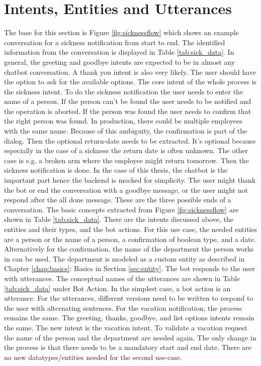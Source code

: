  \section{Intents, Entities and Utterances}
 The base for this section is Figure \ref{fig:sicknessflow} which shows an example conversation 
 for a sickness notification from start to end.
 The identified information from the conversation is displayed in Table \ref{tab:sick_data}.
 In general, the greeting and goodbye intents are expected to be in almost any chatbot conversation.
 A thank you intent is also very likely.
 The user should have the option to ask for the available options.
 The core intent of the whole process is the sickness intent.
 To do the sickness notification the user needs to enter the name of a person.
 If the person can't be found the user needs to be notified and the operation is aborted.
 If the person was found the user needs to confirm that the right person was found.
 In production, there could be multiple employees with the same name. 
 Because of this ambiguity, the confirmation is part of the dialog.
 Then the optional return-date needs to be extracted.
 It's optional because especially in the case of a sickness the return date is often unknown.
 The other case is e.g. a broken arm where the employee might return tomorrow.
 Then the sickness notification is done.
 In the case of this thesis, the chatbot is the important part hence the backend is mocked for simplicity.
 The user might thank the bot or end the conversation with a goodbye message, or the user might not respond after the all done message.
 These are the three possible ends of a conversation.
 The basic concepts extracted from Figure \ref{fig:sicknessflow} are shown in Table \ref{tab:sick_data}.
 There are the intents discussed above, the entities and their types, and the bot actions.
 For this use case, the needed entities are a person or the name of a person, a confirmation of boolean type, and a date.
 Alternatively for the confirmation, the name of the department the person works in can be used.
 The department is modeled as a custom entity as described in Chapter \ref{chap:basics}: Basics in Section \ref{sec:entity}.
 The bot responds to the user with utterances.
 The conceptual names of the utterances are shown in Table \ref{tab:sick_data} under Bot Action.
 In the simplest case, a bot action is an utterance.
 For the utterances, different versions need to be written to respond to the user with alternating sentences.
 For the vacation notification, the process remains the same.
 The greeting, thanks, goodbye, and list options intents remain the same.
 The new intent is the vacation intent.
 To validate a vacation request the name of the person and the department are needed again.
 The only change in the process is that there needs to be a mandatory start and end date.
 There are no new datatypes/entities needed for the second use-case.

